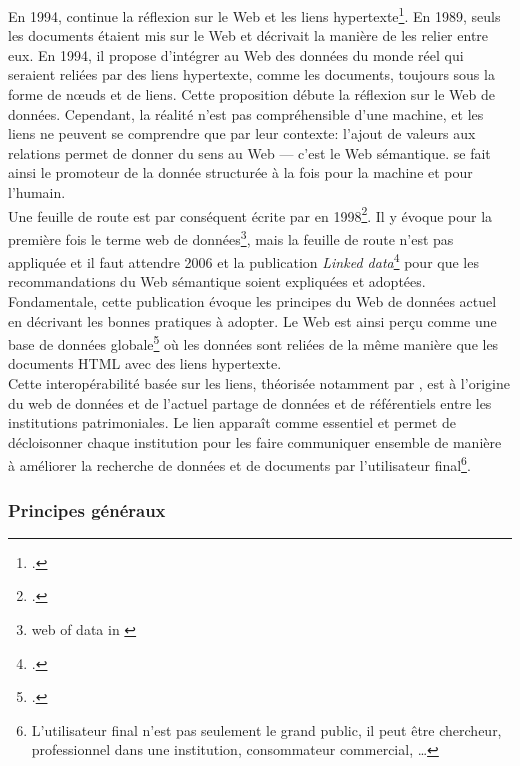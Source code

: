 En 1994,  continue la réflexion sur le Web et les liens hypertexte\footcite{berners-lee_plenary_1994}. En 1989, seuls les documents étaient mis sur le Web et  décrivait la manière de les relier entre eux. En 1994, il propose d'intégrer au Web des données du monde réel qui seraient reliées par des liens hypertexte, comme les documents, toujours sous la forme de nœuds et de liens. Cette proposition débute la réflexion sur le Web de données. Cependant, la réalité n'est pas compréhensible d'une machine, et les liens ne peuvent se comprendre que par leur contexte: l'ajout de valeurs aux relations permet de donner du sens au Web --- c'est le Web sémantique.  se fait ainsi le promoteur de la donnée structurée à la fois pour la machine et pour l'humain.\\

Une feuille de route est par conséquent écrite par  en 1998\footcite{berners-lee_semantic_1998}. Il y évoque pour la première fois le terme \og web de données\fg{}\footnote{\og web of data\fg{} in \cite{berners-lee_semantic_1998}}, mais la feuille de route n'est pas appliquée et il faut attendre 2006 et la publication \textit{Linked data}\footcite{berners-lee_linked_2006} pour que les recommandations du Web sémantique soient expliquées et adoptées. Fondamentale, cette publication évoque les principes du Web de données actuel en décrivant les bonnes pratiques à adopter. Le Web est ainsi perçu comme une \og base de données globale\fg{}\footcite[§29]{bermes_2_2013} où les données sont reliées de la même manière que les documents HTML avec des liens hypertexte.\\

Cette interopérabilité basée sur les liens, théorisée notamment par , est à l'origine du web de données et de l'actuel partage de données et de référentiels entre les institutions patrimoniales. Le lien apparaît comme essentiel et permet de décloisonner chaque institution pour les faire communiquer ensemble de manière à améliorer la recherche de données et de documents par l'utilisateur final\footnote{L'utilisateur final n'est pas seulement le grand public, il peut être chercheur, professionnel dans une institution, consommateur commercial, \dots}.

\subsubsection{\label{II-A-1-a-ii}Principes généraux}

